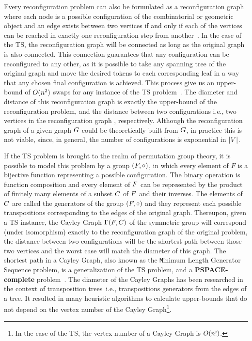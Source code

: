 \documentclass[msc,english,table,xcdraw]{ppgccufmg}
\begin{document}
Every reconfiguration problem can also be formulated as a reconfiguration 
graph where each node is a possible configuration of the combinatorial
or geometric object and an edge exists between two vertices if and only if 
each of the vertices can be reached in exactly one reconfiguration step from
another~\citep{Naomi:2018}.
In the case of the TS, the reconfiguration graph will be connected as long as
the original graph is also connected.
This connection guarantees that any configuration can be reconfigured to any 
other, as it is possible to take any spanning tree of the original graph and 
move the desired tokens to each corresponding leaf in a way that any chosen 
final configuration is achieved.
This process give us an upper-bound of $O(n^{2})$ 
swaps for any instance of the TS problem~\citep{Yamanaka:2015}.
The diameter and distance of this reconfiguration graph is exactly the 
upper-bound of the reconfiguration problem, and the distance between two 
configurations \textemdash i.e., two vertices in the 
reconfiguration graph \textemdash, respectively.
Although the reconfiguration graph of a given graph $G$ could be 
theoretically built from $G$, in practice this is not viable, since, in 
general, the number of configurations is exponential in $|V|$.

If the TS problem is brought to the realm of permutation group theory, it is
possible to model this problem by a group $(F,\circ)$, in which every element 
of $F$ is a bijective function representing a possible configuration. 
The binary operation is function composition and every element of $F$ 
can be represented by the product of finitely many elements of a subset 
$C$ of $F$ and their inverses.
The elements of $C$ are called the generators of the group $(F,\circ)$ 
and they represent each possible transpositions corresponding to the edges 
of the original graph.
Thereupon, given a TS instance, the Cayley Graph $\Gamma(F,C)$ of the symmetric 
group will correspond (under isomorphism) exactly to the reconfiguration graph 
of the original problem, the distance between two configurations will be the 
shortest path between those two vertices and the worst case will match the 
diameter of this graph.
The shortest path in a Cayley Graph, also known as the {\texttt Minimum Length
Generator Sequence} problem, is a generalization of the TS problem, and a 
\textbf{PSPACE-complete} problem~\citep{Jerrum:1985}.
The diameter of the Cayley Graphs has been researched in the context of 
transposition trees~\citep{Akers:1989, Cooperman:1992,
Bafna:1998,Ganesan:Diameter:2012, Ganesan:Strictness:2012,Chitturi:2013,
Kraft:2015,Chitturi:2019}\textemdash i.e., transpositions generators from the 
edges of a tree.
It resulted in many heuristic algorithms to calculate upper-bounds that
do not depend on the vertex number of the Cayley Graph\footnote{In the case of
the TS, the vertex number of a Cayley Graph is $O(n!)$.}.
\end{document}
